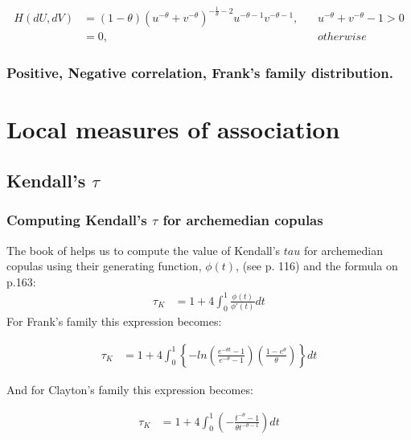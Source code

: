 \documentclass[]{article}
\begin{document}
	$$
  \begin{aligned}
      H(dU, dV) &= (1 - \theta) \left(  u^{-\theta} + v^{-\theta}  \right) ^{-\frac{1}{\theta} - 2} u^{-\theta - 1} v^{-\theta - 1},~~~~ & u^{-\theta} + v^{-\theta} - 1 >0\\
        &= 0, &{otherwise}
  \end{aligned}
	$$



\subsubsection{Positive, Negative correlation, Frank's family distribution.}




\section{Local measures of association}
\subsection{Kendall's $\tau$}
\subsubsection{Computing Kendall's $\tau$ for archemedian copulas}
The book of \cite{nelsen2007introduction} helps us to compute the value of Kendall's $tau$ for archemedian copulas using their generating function, $\phi(t)$, (see p. 116) and the formula on p.163:
	$$
	\begin{aligned}
		\tau_K &= 1 + 4\int_0^1 \frac{\phi(t)}{\phi'(t)}  dt
	\end{aligned}
	$$
For Frank's family this expression becomes:

	$$
	\begin{aligned}
		\tau_K &= 1 + 4\int_0^1 \left\{   -ln \left(  \frac{e^{-\theta t} - 1}{ e^{-\theta} - 1}  \right) \left(  \frac{ 1 - e^{\theta}}{\theta}  \right) \right\}dt
	\end{aligned}
	$$

And for Clayton's family this expression becomes:

	$$
	\begin{aligned}
		\tau_K &= 1 + 4\int_0^1 \left(-  \frac{t^{-\theta} -  1}{\theta t^{-\theta - 1}}  \right) dt
	\end{aligned}
	$$
\end{document}
